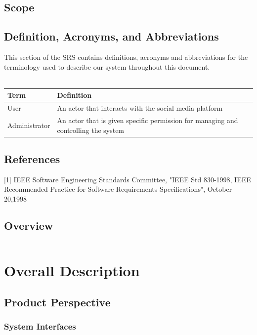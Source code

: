 \documentclass[english]{article}
\begin{document}
		\subsection{Scope}


		\subsection{Definition, Acronyms, and Abbreviations}
				This section of the SRS contains definitions, acronyms and abbreviations for the terminology used to describe our system throughout this document.
				\\
				\\
				\begin{tabular}{ |p{3cm}|p{9cm}|  }
				\hline
				\textbf{Term} & \textbf{Definition}\\
				\hline
				User & An actor that interacts with the social media platform\\
				\hline
				Administrator & An actor that is given specific permission for managing and controlling the system\\
				\hline
				\end{tabular}

		\subsection{References}
			[1] IEEE Software Engineering Standards Committee, "IEEE Std 830-1998, IEEE Recommended Practice for Software Requirements Specifications", October 20,1998

		\subsection{Overview}
				\begin{tabular}{ |p{3cm}||p{11cm}|  }

				\end{tabular}
	\newpage
	\section{Overall Description}
		
		\subsection{Product Perspective}
			
				\subsubsection{System Interfaces}
		
\end{document}
